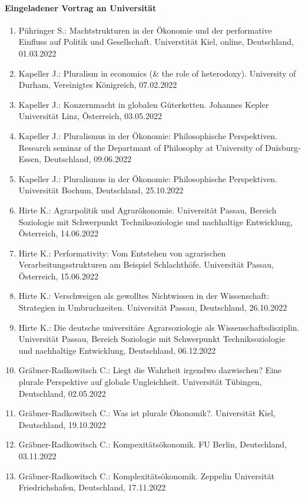 \paragraph{Eingeladener Vortrag an Universität}
\begin{enumerate}
	\item Pühringer S.: Machtstrukturen in der Ökonomie und der performative Einfluss auf Politik und Gesellschaft. Universtität Kiel, online, Deutschland, 01.03.2022
	\item Kapeller J.: Pluralism in economics (\& the role of heterodoxy). University of Durham, Vereinigtes Königreich, 07.02.2022
	\item Kapeller J.: Konzernmacht in globalen Güterketten. Johannes Kepler Universität Linz, Österreich, 03.05.2022
	\item Kapeller J.: Pluralismus in der Ökonomie: Philosophische Perspektiven. Research seminar of the Departmant of Philosophy at University of Duisburg-Essen, Deutschland, 09.06.2022
	\item Kapeller J.: Pluralismus in der Ökonomie: Philosophische Perspektiven. Universität Bochum, Deutschland, 25.10.2022
	\item Hirte K.: Agrarpolitik und Agrarökonomie. Universität Passau, Bereich Soziologie mit Schwerpunkt Techniksoziologie und nachhaltige Entwicklung, Österreich, 14.06.2022
	\item Hirte K.: Performativity: Vom Entstehen von agrarischen Verarbeitungsstrukturen am Beispiel Schlachthöfe. Universität Passau, Österreich, 15.06.2022
	\item Hirte K.: Verschweigen als gewolltes Nichtwissen in der Wissenschaft: Strategien in Umbruchzeiten. Universität Passau, Deutschland, 26.10.2022
	\item Hirte K.: Die deutsche universitäre Agrarsoziologie als Wissenschaftsdisziplin. Universität Passau, Bereich Soziologie mit Schwerpunkt Techniksoziologie und nachhaltige Entwicklung, Deutschland, 06.12.2022
	\item Gräbner-Radkowitsch C.: Liegt die Wahrheit irgendwo dazwischen? Eine plurale Perspektive auf globale Ungleichheit. Universität Tübingen, Deutschland, 02.05.2022
	\item Gräbner-Radkowitsch C.: Was ist plurale Ökonomik?. Universität Kiel, Deutschland, 19.10.2022
	\item Gräbner-Radkowitsch C.: Kompexitätsökonomik. FU Berlin, Deutschland, 03.11.2022
	\item Gräbner-Radkowitsch C.: Komplexitätsökonomik. Zeppelin Universität Friedrichshafen, Deutschland, 17.11.2022
\end{enumerate}
